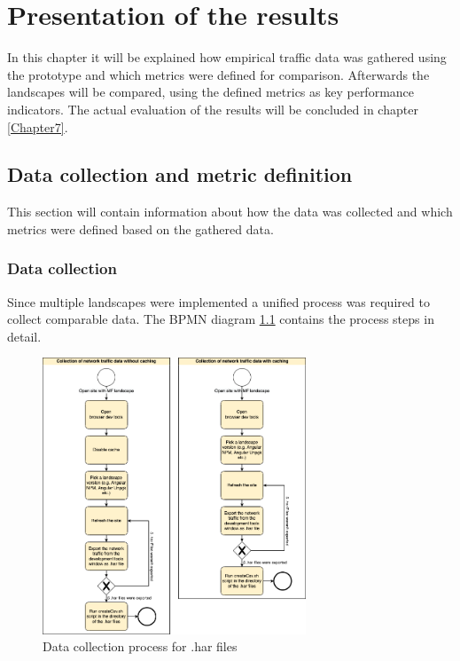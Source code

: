 \chapter{Presentation of the results} %
\label{Chapter6}


In this chapter it will be explained how empirical traffic data was gathered using the prototype and which metrics were defined for comparison.
Afterwards the landscapes will be compared, using the defined metrics as key performance indicators. The actual evaluation of the results will be concluded in chapter \ref{Chapter7}.

\section{Data collection and metric definition} 

This section will contain information about how the data was collected and which metrics were defined based on the gathered data.

\subsection{Data collection}

Since multiple landscapes were implemented a unified process was required to collect comparable data. The BPMN diagram \ref{fig:data_collection_process_har} contains the process steps in detail.

\begin{figure}[!h]
	\centering
	\includegraphics[width=0.7\textwidth]{Figures/Data_Collection_Process_har.drawio.png}
	\caption{Data collection process for .har files}
	\label{fig:data_collection_process_har}
\end{figure}

